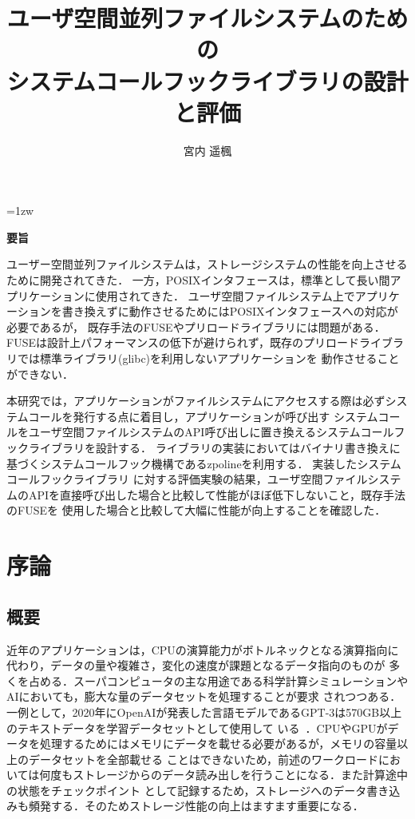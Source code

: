 \documentclass[a4paper,11pt]{jreport}
\title{ユーザ空間並列ファイルシステムのための\\システムコールフックライブラリの設計と評価}
\author{宮内 遥楓}
\begin{document}
\maketitle
\thispagestyle{empty}
\newpage

\thispagestyle{empty}
\vspace*{20pt plus 1fil}
\parindent=1zw
\noindent
\begin{center}
{\Large \bf 要旨}
\vspace{2cm}
\end{center}
ユーザー空間並列ファイルシステムは，ストレージシステムの性能を向上させるために開発されてきた． 
一方，POSIXインタフェースは，標準として長い間アプリケーションに使用されてきた．
ユーザ空間ファイルシステム上でアプリケーションを書き換えずに動作させるためにはPOSIXインタフェースへの対応が必要であるが，
既存手法のFUSEやプリロードライブラリには問題がある．
FUSEは設計上パフォーマンスの低下が避けられず，既存のプリロードライブラリでは標準ライブラリ(glibc)を利用しないアプリケーションを
動作させることができない．

本研究では，アプリケーションがファイルシステムにアクセスする際は必ずシステムコールを発行する点に着目し，アプリケーションが呼び出す
システムコールをユーザ空間ファイルシステムのAPI呼び出しに置き換えるシステムコールフックライブラリを設計する．
ライブラリの実装においてはバイナリ書き換えに基づくシステムコールフック機構であるzpolineを利用する． 実装したシステムコールフックライブラリ
に対する評価実験の結果，ユーザ空間ファイルシステムのAPIを直接呼び出した場合と比較して性能がほぼ低下しないこと，既存手法のFUSEを
使用した場合と比較して大幅に性能が向上することを確認した．

\par
\vspace{0pt plus 1fil}
\newpage

\tableofcontents
\listoffigures
\lstlistoflistings

\pagebreak \setcounter{page}{1}

\chapter{序論}
\section{概要}
近年のアプリケーションは，CPUの演算能力がボトルネックとなる演算指向に代わり，データの量や複雑さ，変化の速度が課題となるデータ指向のものが
多くを占める．スーパコンピュータの主な用途である科学計算シミュレーションやAIにおいても，膨大な量のデータセットを処理することが要求
されつつある．一例として，2020年にOpenAIが発表した言語モデルであるGPT-3は570GB以上のテキストデータを学習データセットとして使用して
いる~\cite{3495883}．CPUやGPUがデータを処理するためにはメモリにデータを載せる必要があるが，メモリの容量以上のデータセットを全部載せる
ことはできないため，前述のワークロードにおいては何度もストレージからのデータ読み出しを行うことになる．また計算途中の状態をチェックポイント
として記録するため，ストレージへのデータ書き込みも頻発する．そのためストレージ性能の向上はますます重要になる．
\end{document}
